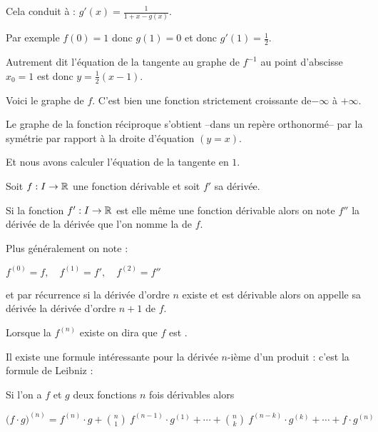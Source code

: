 \change

Cela conduit à :
$g'(x) =  \frac{1}{1+x -g(x)}.$

\change

Par exemple  $f(0)=1$ donc $g(1)=0$ et donc $g'(1)=\frac12$.

\change

Autrement dit l'équation de la tangente 
au graphe de $f^{-1}$ au point d'abscisse $x_0=1$ est donc $y=\frac12 (x-1)$.


\diapo

Voici le graphe de $f$. C'est bien une fonction strictement croissante de$-\infty$ à $+\infty$.

\change

Le graphe de la fonction réciproque s'obtient --dans un repère orthonormé-- par la symétrie 
par rapport à la droite d'équation $(y=x)$.

\change

Et nous avons calculer l'équation de la tangente en $1$. 



\diapo


Soit $f : I \to \mathbb{R}$ une fonction dérivable et soit $f'$ sa dérivée.

\change

Si la fonction $f' : I \to \mathbb{R}$ est elle même une fonction dérivable alors on note
$f''$ la dérivée de la dérivée que l'on nomme  la  de $f$. 

\change


Plus généralement on note :

$f^{(0)} = f, \quad f^{(1)} = f', \quad f^{(2)} = f''$

et par récurrence si  la dérivée d'ordre $n$ existe et est dérivable alors
on appelle sa dérivée la dérivée d'ordre $n+1$ de $f$.

\change


Lorsque la  $f^{(n)}$ existe 
 on dira que $f$ est .

\change


Il existe une formule intéressante pour la dérivée $n$-ième d'un produit :
c'est la formule de Leibniz :

Si l'on a $f$ et $g$ deux fonctions $n$ fois dérivables alors 


$ \big( f \cdot g \big)^{(n)} =  f^{(n)} \cdot g + \binom{n}{1}\ f^{(n-1)}\cdot g^{(1)}
+ \cdots + \binom{n}{k} \ f^{(n-k)} \cdot g^{(k)}+\cdots + f \cdot g^{(n)}$

